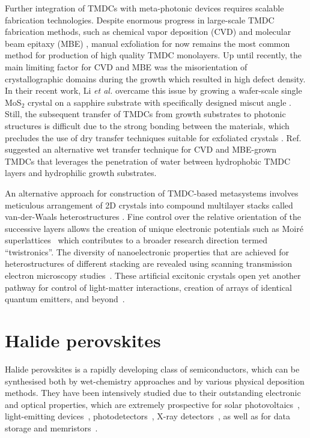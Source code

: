 \documentclass[journal=chreay,manuscript=review]{achemso}
\begin{document}
Further integration of TMDCs with meta-photonic devices requires scalable fabrication technologies. Despite enormous progress in large-scale TMDC fabrication methods, such as chemical vapor deposition (CVD) \cite{shree2019high} and molecular beam epitaxy (MBE) \cite{fu2017molecular}, manual exfoliation for now remains the most common method for production of high quality TMDC monolayers. Up until recently, the main limiting factor for CVD and MBE was the misorientation of crystallographic domains during the growth which resulted in high defect density. In their recent work, Li \textit{et al.} overcame this issue by growing a wafer-scale single MoS$_2$ crystal on a sapphire substrate with specifically designed miscut angle \cite{li2021epitaxial}. Still, the subsequent transfer of TMDCs from growth substrates to photonic structures is difficult due to the strong bonding between the materials, which precludes the use of dry transfer techniques suitable for exfoliated crystals \cite{castellanos2014deterministic}. Ref.~ suggested an alternative wet transfer technique for CVD and  MBE-grown TMDCs that leverages the penetration of water between hydrophobic TMDC layers and hydrophilic growth substrates.

An alternative approach for construction of TMDC-based metasystems involves meticulous arrangement of 2D crystals into compound multilayer stacks called van-der-Waals heterostructures \cite{geim2013van}. Fine control over the relative orientation of the successive layers allows the creation of unique electronic potentials such as Moir{\'e} superlattices~\cite{tran2019evidence, seyler2019signatures} which contributes to a broader research direction termed ``twistronics''\cite{carr2017twistronics}. The diversity of nanoelectronic properties that are achieved for heterostructures of different stacking are revealed using scanning transmission electron microscopy studies~\cite{weston2020atomic}. These artificial excitonic crystals open yet another pathway for control of light-matter interactions, creation of arrays of identical quantum emitters, and beyond~\cite{tran2020moire}. 

\section{Halide perovskites}
\label{sec:pero}

Halide perovskites is a rapidly developing class of semiconductors, which can be synthesised both by wet-chemistry approaches and by various physical deposition methods. They have been intensively studied due to their outstanding electronic and optical properties, which are extremely prospective for solar photovoltaics~\cite{stranks2015metal,jena2019halide,li2020perovskite}, light-emitting devices~\cite{sutherland2016perovskite, liu2021metal, gets2021reconfigurable}, photodetectors~\cite{dou2014solution,ahmadi2017review,marunchenko2021single}, X-ray detectors~\cite{wei2016sensitive}, as well as for data storage and memristors~\cite{zhumekenov2021stimuli,liu2022nanostructured}.
\end{document}
